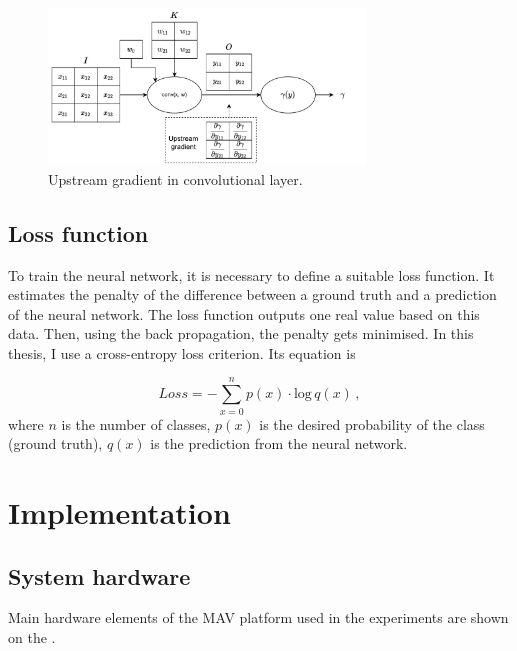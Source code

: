 \begin{figure}[!h]

  \centering
  \includegraphics[width=0.75\textwidth]{./fig/photos/Conv_BP.pdf}
  \caption{Upstream gradient in convolutional layer.}
  \label{fig:conv_bp}
\end{figure}



\section{Loss function}
\label{loss}

To train the neural network, it is necessary to define a suitable loss function. It estimates the penalty of the difference between a ground truth and a prediction of the neural network. The loss function outputs one real value based on this data. Then, using the back propagation, the penalty gets minimised. In this thesis, I use a cross-entropy loss criterion. Its equation is

\begin{equation}
	Loss = -\sum\limits_{x=0}^n p(x)\cdot \textrm{log} \,q(x) \,,
\end{equation}
where $n$ is the number of classes, $p(x)$ is the desired probability of the class (ground truth), $q(x)$ is the prediction from the neural network.




\chapter{Implementation}

\section{System hardware}

Main hardware elements of the \acs{MAV} platform used in the experiments are shown on the . 

